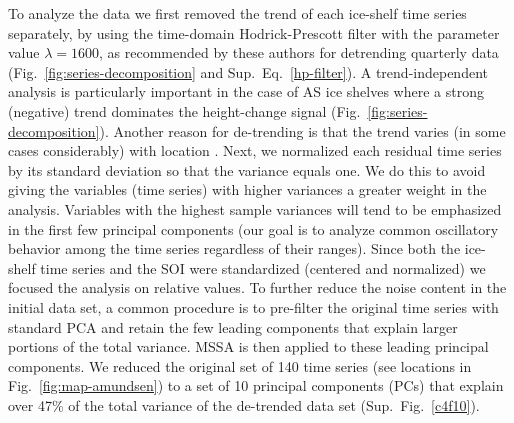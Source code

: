 To analyze the data we first removed the trend of each ice-shelf time series separately, by using the time-domain Hodrick-Prescott filter \parencite{Hodrick1997} with the parameter value $\lambda= 1600$, as recommended by these authors for detrending quarterly data (Fig.~\ref{fig:series-decomposition} and Sup.~Eq.~\ref{hp-filter}). A trend-independent analysis is particularly important in the case of AS ice shelves where a strong (negative) trend dominates the height-change signal (Fig.~\ref{fig:series-decomposition}). Another reason for de-trending is that the trend varies (in some cases considerably) with location \parencite{Paolo2015, Pritchard2012, Shepherd2010}. Next, we normalized each residual time series by its standard deviation so that the variance equals one. We do this to avoid giving the variables (time series) with higher variances a greater weight in the analysis. Variables with the highest sample variances will tend to be emphasized in the first few principal components (our goal is to analyze common oscillatory behavior among the time series regardless of their ranges). Since both the ice-shelf time series and the SOI were standardized (centered and normalized) we focused the analysis on relative values. To further reduce the noise content in the initial data set, a common procedure is to pre-filter the original time series with standard PCA and retain the few leading components that explain larger portions of the total variance. MSSA is then applied to these leading principal components. We reduced the original set of 140 time series (see locations in Fig.~\ref{fig:map-amundsen}) to a set of 10 principal components (PCs) that explain over 47\% of the total variance of the de-trended data set (Sup.~Fig.~\ref{c4f10}).


